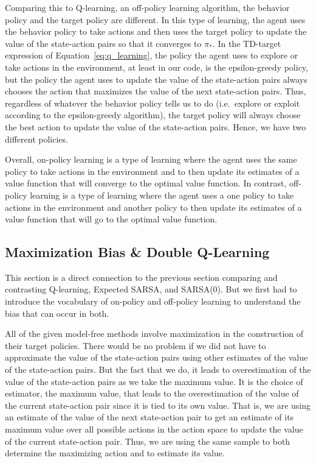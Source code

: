 Comparing this to Q-learning, an off-policy learning algorithm, the behavior policy and the target policy are different.
In this type of learning, the agent uses the behavior policy to take actions and then uses the target policy to update the value of the state-action pairs so that it converges to $\pi_*$.
In the TD-target expression of Equation\ \ref{eq:q_learning}, the policy the agent uses to explore or take actions in the environment, at least in our code, is the epsilon-greedy policy, but the policy the agent uses to update the value of the state-action pairs always chooses the action that maximizes the value of the next state-action pairs.
Thus, regardless of whatever the behavior policy tells us to do (i.e.\ explore or exploit according to the epsilon-greedy algorithm), the target policy will always choose the best action to update the value of the state-action pairs.
Hence, we have two different policies.

Overall, on-policy learning is a type of learning where the agent uses the same policy to take actions in the environment and to then update its estimates of a value function that will converge to the optimal value function.
In contrast, off-policy learning is a type of learning where the agent uses a one policy to take actions in the environment and another policy to then update its estimates of a value function that will go to the optimal value function.

\subsection*{Maximization Bias \& Double Q-Learning}
This section is a direct connection to the previous section comparing and contrasting Q-learning, Expected SARSA, and SARSA(0).
But we first had to introduce the vocabulary of on-policy and off-policy learning to understand the bias that can occur in both.

All of the given model-free methods involve maximization in the construction of their target policies.
There would be no problem if we did not have to approximate the value of the state-action pairs using other estimates of the value of the state-action pairs.
But the fact that we do, it leads to overestimation of the value of the state-action pairs as we take the maximum value.
It is the choice of estimator, the maximum value, that leads to the overestimation of the value of the current state-action pair since it is tied to its own value.
That is, we are using an estimate of the value of the next state-action pair to get an estimate of its maximum value over all possible actions in the action space to update the value of the current state-action pair.
Thus, we are using the same sample to both determine the maximizing action and to estimate its value.

